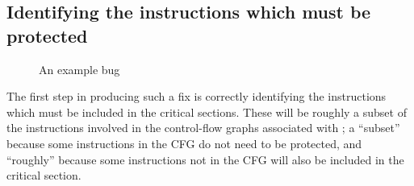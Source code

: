 \subsection{Identifying the instructions which must be protected}

\begin{figure}
  \hspace{-5mm}
  \hspace{-10mm}
  \caption{An example bug}
  \label{fig:fix_bug:complex_local}
\end{figure}

The first step in producing such a fix is correctly identifying the
instructions which must be included in the critical sections.  These
will be roughly a subset of the instructions involved in the
control-flow graphs associated with \StateMachines; a ``subset''
because some instructions in the CFG do not need to be protected, and
``roughly'' because some instructions not in the CFG will also be
included in the critical section.

